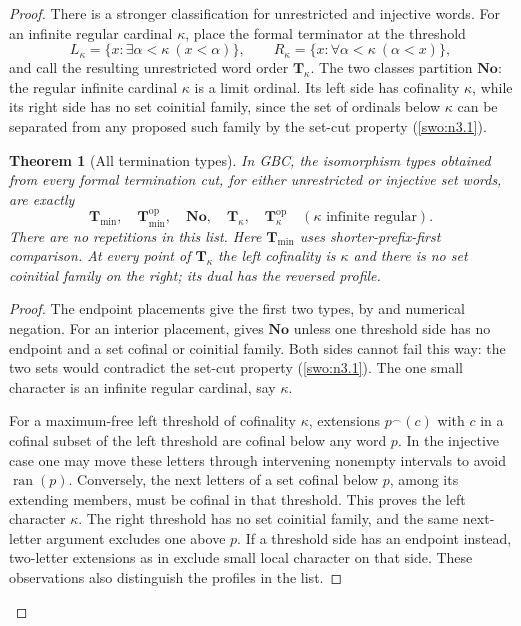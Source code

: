 \documentclass[11pt]{article}
\newtheorem{theorem}{Theorem}[section]
\theoremstyle{definition}
\theoremstyle{remark}
\newcommand{\No}{\mathbf{No}}
\newcommand{\ran}{\operatorname{ran}}
\newcommand{\cat}{\mathbin{{}^\frown}}
\begin{document}
\begin{proof}
There is a stronger classification for unrestricted and injective words.
For an infinite regular cardinal $\kappa$, place the formal terminator
at the threshold
\[
 L_\kappa=\{x:\exists\alpha<\kappa\ (x<\alpha)\},\qquad
 R_\kappa=\{x:\forall\alpha<\kappa\ (\alpha<x)\},
\]
and call the resulting unrestricted word order $\mathbf T_\kappa$. The two
classes partition $\No$: the regular infinite cardinal $\kappa$ is a
limit ordinal. Its left side has cofinality $\kappa$, while its right
side has no set coinitial family, since the set of ordinals below
$\kappa$ can be separated from any proposed such family by
the set-cut property (\cref{swo:n3.1}).

\begin{theorem}[All termination types]\label{swo:ds:thm:alltermination}
In GBC, the isomorphism types obtained from every formal termination
cut, for either unrestricted or injective set words, are exactly
\[
 \mathbf T_{\min},\quad\mathbf T_{\min}^{\mathrm{op}},\quad\No,\quad
 \mathbf T_\kappa,\quad \mathbf T_\kappa^{\mathrm{op}}
 \quad(\kappa\text{ infinite regular}).
\tag{S16.8}\label{swo:ds:eq:alltermination}
\]
There are no repetitions in this list. Here $\mathbf T_{\min}$ uses
shorter-prefix-first comparison. At every point of $\mathbf T_\kappa$ the
left cofinality is $\kappa$ and there is no set coinitial family on the
right; its dual has the reversed profile.
\end{theorem}
\begin{proof}
The endpoint placements give the first two types, by
 and numerical negation. For an
interior placement,  gives $\No$ unless
one threshold side has no endpoint and a set cofinal or coinitial
family. Both sides cannot fail this way: the two sets would contradict
the set-cut property (\cref{swo:n3.1}). The one small character is an infinite regular
cardinal, say $\kappa$.

For a maximum-free left threshold of cofinality $\kappa$, extensions
$p\cat(c)$ with $c$ in a cofinal subset of the left threshold are
cofinal below any word $p$. In the injective case one may move these
letters through intervening nonempty intervals to avoid $\ran(p)$.
Conversely, the next letters of a set cofinal below $p$, among its
extending members, must be cofinal in that threshold. This proves the
left character $\kappa$. The right threshold has no set coinitial
family, and the same next-letter argument excludes one above $p$.
If a threshold side has an endpoint instead, two-letter extensions as
in  exclude small local character on that
side. These observations also distinguish the profiles in the list.


\end{proof}
\end{proof}
\end{document}
